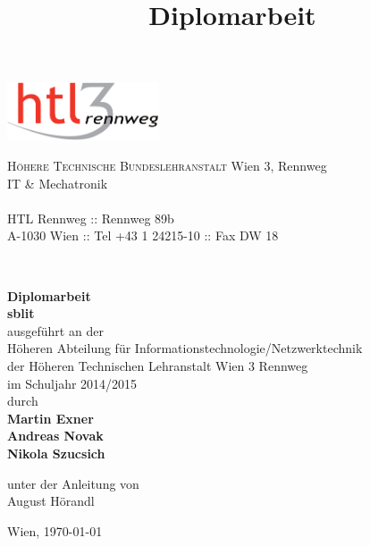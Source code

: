 \documentclass[a4paper,ngerman,naustrian,DIV=12,BCOR=1cm]{scrbook}
\begin{document}
\title{Diplomarbeit}
\begin{titlepage}
\begin{minipage}[b]{1\columnwidth}
\parbox[b]{50mm}{\includegraphics[width=45mm]{HTL3RLogoRGB}}
\hfill
\parbox[b]{130mm}{\footnotesize \textsc{Höhere Technische Bundeslehranstalt} Wien 3, Rennweg\\
IT \& Mechatronik\\
\\
HTL Rennweg :: Rennweg 89b\\
A-1030 Wien :: Tel +43 1 24215-10 :: Fax DW 18
}\\
\mbox{}
\end{minipage}

\vspace{1cm}


\begin{center}
\textbf{\LARGE{}Diplomarbeit}{\large{}}\\
{\large{}\vspace{15mm}
 }\textbf{\large{}sblit}\\
 \vspace{15mm}
 ausgeführt an der\\
 Höheren Abteilung für Informationstechnologie/Netzwerktechnik\\
 der Höheren Technischen Lehranstalt Wien 3 Rennweg\\
 \vspace{1cm}
 im Schuljahr 2014/2015\\
 \vspace{1cm}
 durch\\
 \vspace{0.5cm}
\textbf{\large{}Martin Exner}\\
\textbf{\large{}Andreas Novak}\\
\textbf{\large{}Nikola Szucsich}\\

\par\end{center}{\large \par}

\begin{center}
\vspace{20mm}
 \normalsize unter der Anleitung von\\
 \vspace{0.5cm}
 August Hörandl
\par\end{center}

\begin{center}
\vspace{5mm}
Wien, \today 
\par\end{center}

\end{titlepage}%
\end{document}
